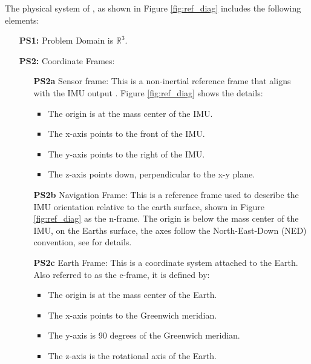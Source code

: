 \documentclass[12pt]{article}
\begin{document}
The physical system of \progname{}, as shown in Figure \ref{fig:ref_diag} includes the following
elements:

\begin{itemize}
  \item[\textbf{PS1:}] Problem Domain is $\mathbb{R}^3$.

  \item[\textbf{PS2:}] Coordinate Frames:
  \begin{itemize}
      \item[\textbf{PS2a}] Sensor frame: This is a non-inertial reference frame that aligns with the
      IMU output \cite{al-jlailaty_efficient_2020}. Figure \ref{fig:ref_diag} shows the details:
        \begin{itemize}
            \item The origin is at the mass center of the IMU.
            \item The x-axis points to the front of the IMU.
            \item The y-axis points to the right of the IMU.
            \item The z-axis points down, perpendicular to the x-y plane.
        \end{itemize}
    \item[\textbf{PS2b}] Navigation Frame: This is a reference frame used to describe the IMU
    orientation relative to the earth surface, shown in Figure \ref{fig:ref_diag} as the n-frame.
    The origin is below the mass center of the IMU, on the Earths surface, the axes follow the
    North-East-Down (NED) convention, see \cite{ned} for details.

    \item[\textbf{PS2c}] Earth Frame: This is a coordinate system attached to the Earth. Also
    referred to as the e-frame, it is defined by:
    \begin{itemize}
        \item The origin is at the mass center of the Earth.
        \item The x-axis points to the Greenwich meridian.
        \item The y-axis is 90 degrees of the Greenwich meridian.
        \item The z-axis is the rotational axis of the Earth.
        \end{itemize}
  \end{itemize}
  

\end{itemize}
\end{document}

